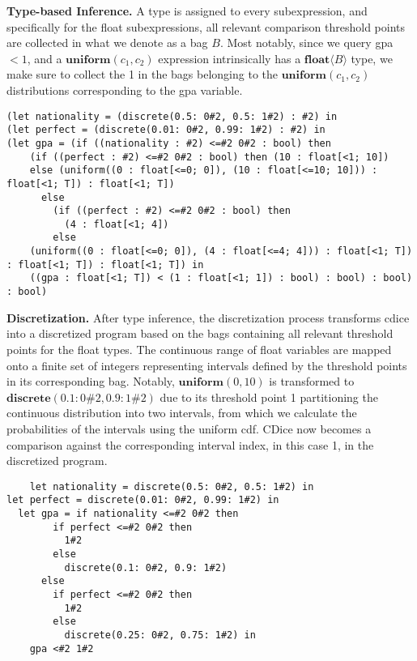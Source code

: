 \documentclass[acmsmall,screen,dvipsnames,x11names,nonacm,anonymous,review]{acmart}
\begin{document}
\textbf{Type-based Inference.} A type is assigned to every subexpression, and specifically for the float subexpressions, all relevant comparison threshold points are collected in what we denote as a bag $B$. Most notably, since we query gpa $< 1$, and a $\textbf{uniform}(c_1,c_2)$ expression intrinsically has a $\textbf{float}\langle B \rangle$ type, we make sure to collect the 1 in the bags belonging to the $\textbf{uniform}(c_1,c_2)$ distributions corresponding to the gpa variable.

\begin{lstlisting}
(let nationality = (discrete(0.5: 0#2, 0.5: 1#2) : #2) in
(let perfect = (discrete(0.01: 0#2, 0.99: 1#2) : #2) in
(let gpa = (if ((nationality : #2) <=#2 0#2 : bool) then
    (if ((perfect : #2) <=#2 0#2 : bool) then (10 : float[<1; 10])
    else (uniform((0 : float[<=0; 0]), (10 : float[<=10; 10])) : float[<1; T]) : float[<1; T])
      else
        (if ((perfect : #2) <=#2 0#2 : bool) then
          (4 : float[<1; 4])
        else
    (uniform((0 : float[<=0; 0]), (4 : float[<=4; 4])) : float[<1; T]) : float[<1; T]) : float[<1; T]) in
    ((gpa : float[<1; T]) < (1 : float[<1; 1]) : bool) : bool) : bool) : bool)
\end{lstlisting}


\textbf{Discretization.} After type inference, the discretization process transforms cdice into a discretized program based on the bags containing all relevant threshold points for the float types. The continuous range of float variables are mapped onto a finite set of integers representing intervals defined by the threshold points in its corresponding bag. Notably, $\textbf{uniform}(0,10)$ is transformed to $\textbf{discrete}(0.1: 0\#2, 0.9: 1\#2)$ due to its threshold point 1 partitioning the continuous distribution into two intervals, from which we calculate the probabilities of the intervals using the uniform cdf. CDice now becomes a comparison against the corresponding interval index, in this case 1, in the discretized program.

\begin{lstlisting}
    let nationality = discrete(0.5: 0#2, 0.5: 1#2) in
let perfect = discrete(0.01: 0#2, 0.99: 1#2) in
  let gpa = if nationality <=#2 0#2 then
        if perfect <=#2 0#2 then
          1#2
        else
          discrete(0.1: 0#2, 0.9: 1#2)
      else
        if perfect <=#2 0#2 then
          1#2
        else
          discrete(0.25: 0#2, 0.75: 1#2) in
    gpa <#2 1#2
\end{lstlisting}
\end{document}
